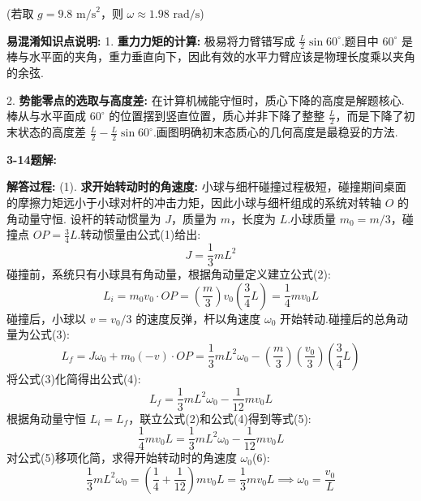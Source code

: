 (若取 $g = 9.8\text{ m/s}^2$，则 $\omega \approx 1.98\text{ rad/s}$)

\vspace{1em}

\textbf{易混淆知识点说明:}
1. \textbf{重力力矩的计算:} 极易将力臂错写成 $\frac{L}{2} \sin 60^\circ$.题目中 $60^\circ$ 是棒与水平面的夹角，重力垂直向下，因此有效的水平力臂应该是物理长度乘以夹角的余弦.

2. \textbf{势能零点的选取与高度差:} 在计算机械能守恒时，质心下降的高度是解题核心.棒从与水平面成 $60^\circ$ 的位置摆到竖直位置，质心并非下降了整整 $\frac{L}{2}$，而是下降了初末状态的高度差 $\frac{L}{2} - \frac{L}{2} \sin 60^\circ$.画图明确初末态质心的几何高度是最稳妥的方法.

\vspace{2em}

\textbf{3-14题解:}


\textbf{解答过程:}
(1). \textbf{求开始转动时的角速度:}
小球与细杆碰撞过程极短，碰撞期间桌面的摩擦力矩远小于小球对杆的冲击力矩，因此小球与细杆组成的系统对转轴 $O$ 的角动量守恒.
设杆的转动惯量为 $J$，质量为 $m$，长度为 $L$.小球质量 $m_0 = m/3$，碰撞点 $OP = \frac{3}{4}L$.转动惯量由公式(1)给出:
\begin{equation}
	J = \frac{1}{3}mL^2
\end{equation}
碰撞前，系统只有小球具有角动量，根据角动量定义建立公式(2):
\begin{equation}
	L_i = m_0 v_0 \cdot OP = \left(\frac{m}{3}\right) v_0 \left(\frac{3}{4}L\right) = \frac{1}{4} m v_0 L
\end{equation}
碰撞后，小球以 $v = v_0/3$ 的速度反弹，杆以角速度 $\omega_0$ 开始转动.碰撞后的总角动量为公式(3):
\begin{equation}
	L_f = J \omega_0 + m_0 (-v) \cdot OP = \frac{1}{3}mL^2 \omega_0 - \left(\frac{m}{3}\right) \left(\frac{v_0}{3}\right) \left(\frac{3}{4}L\right)
\end{equation}
将公式(3)化简得出公式(4):
\begin{equation}
	L_f = \frac{1}{3}mL^2 \omega_0 - \frac{1}{12} m v_0 L
\end{equation}
根据角动量守恒 $L_i = L_f$，联立公式(2)和公式(4)得到等式(5):
\begin{equation}
	\frac{1}{4} m v_0 L = \frac{1}{3}mL^2 \omega_0 - \frac{1}{12} m v_0 L
\end{equation}
对公式(5)移项化简，求得开始转动时的角速度 $\omega_0$(6):
\begin{equation}
	\frac{1}{3}mL^2 \omega_0 = \left(\frac{1}{4} + \frac{1}{12}\right) m v_0 L = \frac{1}{3} m v_0 L \implies \omega_0 = \frac{v_0}{L}
\end{equation}


